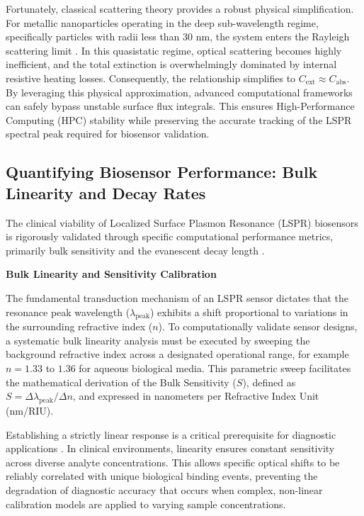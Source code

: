 \documentclass[class=report, crop=false]{standalone}
\begin{document}
\vspace{12pt}

Fortunately, classical scattering theory provides a robust physical simplification. For metallic nanoparticles operating in the deep sub-wavelength regime, specifically particles with radii less than 30 nm, the system enters the Rayleigh scattering limit \citep{Mayer2011}. In this quasistatic regime, optical scattering becomes highly inefficient, and the total extinction is overwhelmingly dominated by internal resistive heating losses. Consequently, the relationship simplifies to $C_{\text{ext}} \approx C_{\text{abs}}$. By leveraging this physical approximation, advanced computational frameworks can safely bypass unstable surface flux integrals. This ensures High-Performance Computing (HPC) stability while preserving the accurate tracking of the LSPR spectral peak required for biosensor validation.

\subsection{Quantifying Biosensor Performance: Bulk Linearity and Decay Rates}

The clinical viability of Localized Surface Plasmon Resonance (LSPR) biosensors is rigorously validated through specific computational performance metrics, primarily bulk sensitivity and the evanescent decay length \citep{Das2023}.

\vspace{12pt}

\noindent\textbf{Bulk Linearity and Sensitivity Calibration}

\vspace{6pt}

The fundamental transduction mechanism of an LSPR sensor dictates that the resonance peak wavelength ($\lambda_{\text{peak}}$) exhibits a shift proportional to variations in the surrounding refractive index ($n$). To computationally validate sensor designs, a systematic bulk linearity analysis must be executed by sweeping the background refractive index across a designated operational range, for example $n = 1.33$ to $1.36$ for aqueous biological media. This parametric sweep facilitates the mathematical derivation of the Bulk Sensitivity ($S$), defined as $S = \Delta\lambda_{\text{peak}} / \Delta n$, and expressed in nanometers per Refractive Index Unit (nm/RIU).

\vspace{12pt}

Establishing a strictly linear response is a critical prerequisite for diagnostic applications \citep{Mayer2011}. In clinical environments, linearity ensures constant sensitivity across diverse analyte concentrations. This allows specific optical shifts to be reliably correlated with unique biological binding events, preventing the degradation of diagnostic accuracy that occurs when complex, non-linear calibration models are applied to varying sample concentrations.
\end{document}
